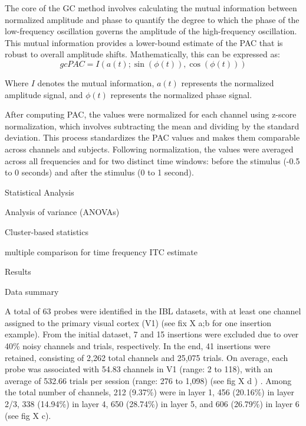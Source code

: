 \documentclass[
  letterpaper,
  DIV=11,
  numbers=noendperiod]{scrartcl}
\begin{document}
The core of the GC method involves calculating the mutual information
between normalized amplitude and phase to quantify the degree to which
the phase of the low-frequency oscillation governs the amplitude of the
high-frequency oscillation. This mutual information provides a
lower-bound estimate of the PAC that is robust to overall amplitude
shifts. Mathematically, this can be expressed as: \[
gcPAC = I(a(t); \sin(\phi(t)), \cos(\phi(t)))
\]

Where \(I\) denotes the mutual information, \(a(t)\) represents the
normalized amplitude signal, and \(\phi(t)\) represents the normalized
phase signal.

After computing PAC, the values were normalized for each channel using
z-score normalization, which involves subtracting the mean and dividing
by the standard deviation. This process standardizes the PAC values and
makes them comparable across channels and subjects. Following
normalization, the values were averaged across all frequencies and for
two distinct time windows: before the stimulus (-0.5 to 0 seconds) and
after the stimulus (0 to 1 second).

Statistical Analysis

Analysis of variance (ANOVAs)

Cluster-based statistics

multiple comparison for time frequency ITC estimate

Results

Data summary

A total of 63 probes were identified in the IBL datasets, with at least
one channel assigned to the primary visual cortex (V1) (see fix X a;b
for one insertion example). From the initial dataset, 7 and 15
insertions were excluded due to over 40\% noisy channels and trials,
respectively. In the end, 41 insertions were retained, consisting of
2,262 total channels and 25,075 trials. On average, each probe was
associated with 54.83 channels in V1 (range: 2 to 118), with an average
of 532.66 trials per session (range: 276 to 1,098) (see fig X d ) .
Among the total number of channels, 212 (9.37\%) were in layer 1, 456
(20.16\%) in layer 2/3, 338 (14.94\%) in layer 4, 650 (28.74\%) in layer
5, and 606 (26.79\%) in layer 6 (see fig X c).
\end{document}
